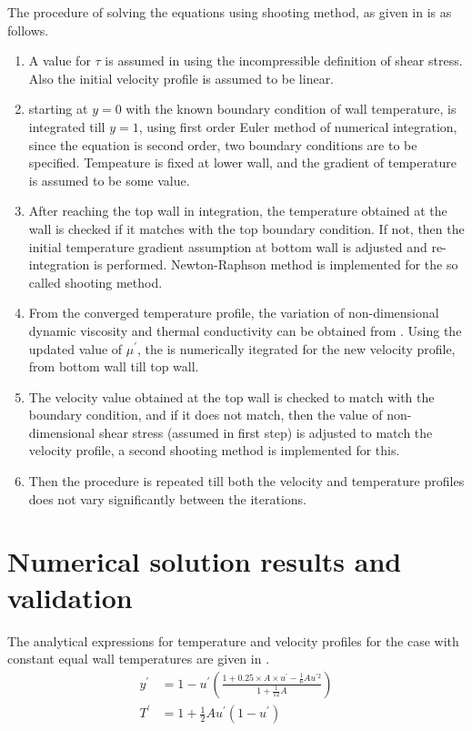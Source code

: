 \par The procedure of solving the equations using shooting method, as given in
\cite{ref_1} is as follows.
\begin{enumerate}
    \item A value for \(\tau\) is assumed in  using the incompressible
        definition of shear stress. Also the initial velocity profile is assumed
        to be linear.
    \item starting at \(y=0\) with the known boundary condition of wall temperature,
         is integrated till \(y=1\), using first order Euler method
        of numerical integration, since the equation is second order, two
        boundary conditions are to be specified. Tempeature is fixed at
        lower wall, and the gradient of temperature is assumed to be some value.
    \item After reaching the top wall in integration, the temperature obtained
        at the wall is checked if it matches with the top boundary condition. If not,
        then the initial temperature gradient assumption at bottom wall is
        adjusted and re-integration is performed. Newton-Raphson method is
        implemented for the so called shooting method.
    \item From the converged temperature profile, the variation of non-dimensional
        dynamic viscosity and thermal conductivity can be obtained from
        . Using the updated value of \(\mu^\prime\), the 
        is numerically itegrated for the new velocity profile, from bottom wall
        till top wall.
    \item The velocity value obtained at the top wall is checked to match with
        the boundary condition, and if it does not match, then the value of
        non-dimensional shear stress (assumed in first step) is adjusted to
        match the velocity profile, a second shooting method is implemented
        for this.

    \item Then the procedure is repeated till both the velocity and temperature
        profiles does not vary significantly between the iterations.
\end{enumerate}

\section{Numerical solution results and validation}
\par The analytical expressions for temperature and velocity profiles for the
case with constant equal wall temperatures are given in .
\begin{align}
    y^\prime &= 1 - u^\prime\left(\frac{1 + 0.25 \times A \times u^\prime - \frac{1}{6} Au^{\prime 2}}{1 + \frac{1}{12}A}\right) \label{u_A_ewt_eqn} \\
    T^\prime &= 1 + \frac{1}{2} A u^\prime \left(1 - u^\prime\right) \label{t_A_ewt_eqn}
\end{align}

